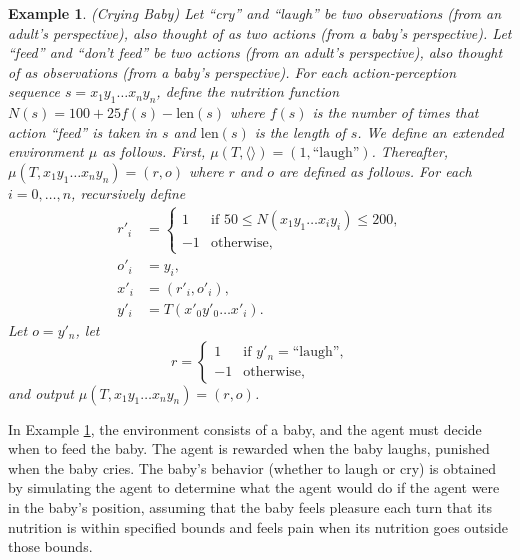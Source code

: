 \documentclass{article}
\newtheorem{myexample}[mytheorem]{Example}
\begin{document}
\begin{myexample}
\label{cryingbabyexample}
  (Crying Baby)
  Let ``cry'' and ``laugh'' be two observations (from an adult's perspective),
  also thought of as two actions (from a baby's perspective).
  Let ``feed'' and ``don't feed'' be two actions (from an adult's perspective),
  also thought of as observations (from a baby's perspective).
  For each action-perception sequence $s=x_1y_1\ldots x_ny_n$, define the
  nutrition function $N(s)=100+25f(s)-\mbox{len}(s)$ where $f(s)$ is the number
  of times that action ``feed'' is taken in $s$ and $\mbox{len}(s)$ is the length of $s$.
  We define an extended environment $\mu$ as follows.
  First, $\mu(T,\langle\rangle)=(1,\mbox{``laugh''})$.
  Thereafter, $\mu(T,x_1y_1\ldots x_ny_n)=(r,o)$ where $r$ and $o$ are defined as follows.
  For each $i=0,\ldots,n$, recursively define
  \begin{align*}
    r'_i &=
      \begin{cases}
        1 & \mbox{if $50 \leq N(x_1y_1\ldots x_iy_i)\leq 200$,}\\
        -1 & \mbox{otherwise,}
      \end{cases}\\
    o'_i &= y_i,\\
    x'_i &= (r'_i,o'_i),\\
    y'_i &= T(x'_0y'_0 \ldots x'_i).
  \end{align*}
  Let $o=y'_n$, let
  \[
    r=
      \begin{cases}
        1 & \mbox{if $y'_n=\mbox{``laugh''}$,}\\
        -1 & \mbox{otherwise,}
      \end{cases}
  \]
  and output $\mu(T,x_1y_1\ldots x_ny_n)=(r,o)$.
\end{myexample}

In Example \ref{cryingbabyexample}, the environment consists of a baby, and the
agent must decide when to feed the baby. The agent is rewarded when the baby laughs,
punished when the baby cries. The baby's behavior (whether to laugh or cry) is obtained
by simulating the agent to determine what the agent would do if the agent were in the
baby's position, assuming that the baby feels pleasure each turn that its nutrition is
within specified bounds and feels pain when its nutrition goes outside those bounds.
\end{document}
